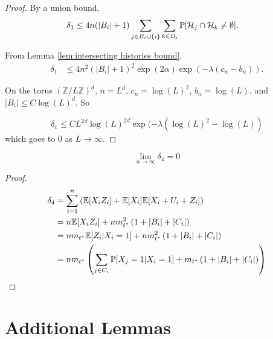 \begin{proof}
	By a union bound,
	\begin{align}
		\delta_1 &\leq 4 n (|B_i| + 1) \sum_{j \in B_i \cup \{i\}} \sum_{k \in D_i} \mathbb{P}[\mathcal{H}_{j} \cap \mathcal{H}_k \neq \emptyset].
	\end{align}

	From Lemma \ref{lem:intersecting histories bound},
	\begin{align}
		\delta_1 &\leq 4 n^2 (|B_i| + 1)^2 \exp(2\alpha) \exp(-\lambda(c_n - b_n)).
	\end{align}

	On the torus $(\mathbb{Z} / L \mathbb{Z})^d$, $n = L^d$, $c_n = \log(L)^2$, $b_n = \log(L)$, and $|B_i| \leq C \log(L)^d$. So

	\begin{equation}
		\delta_1 \leq C L^{2d} \log(L)^{2d} \exp(-\lambda(\log(L)^2 - \log(L))
	\end{equation}
	which goes to $0$ as $L \rightarrow \infty$.
\end{proof}

\begin{lemma}
\label{lem:delta4 goes to 0 general}
	\begin{equation}
		\lim_{n\rightarrow\infty} \delta_4 = 0
	\end{equation}
\end{lemma}
\begin{proof}
	\begin{align}
		\delta_4 &= \sum_{i = 1}^n \left(\expect[X_i Z_i] + \expect[X_i]\expect[X_i + U_i + Z_i]\right)\\
			&= n \expect[X_i Z_i] + n m_{t^*}^2 \left(1 + |B_i| + |C_i|\right)\\
			&= n m_{t^*} \expect[Z_i | X_i = 1] + n m_{t^*}^2 \left(1 + |B_i| + |C_i|\right)\\
			&= n m_{t^*} \left(\sum_{j \in C_i} \prob[X_j = 1 | X_i = 1] + m_{t^*} \left(1 + |B_i| + |C_i|\right) \right)%
	\end{align}

\end{proof}

\section{Additional Lemmas}

